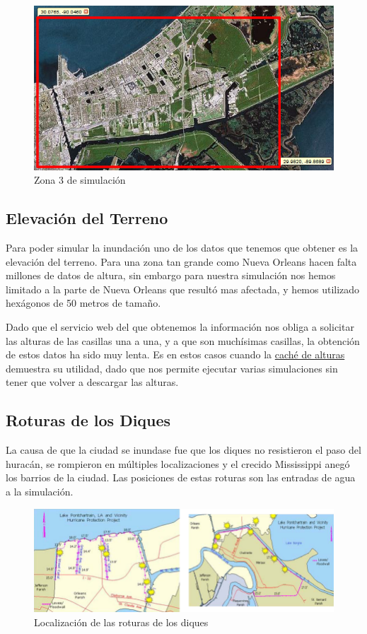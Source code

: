 \begin{figure}[H]
 \centering
 \includegraphics[width=130mm]{figuras/cap6/NOarea4.png}
 \caption{Zona 3 de simulación} \label{zona3}
\end{figure}

\subsection{Elevación del Terreno}

Para poder simular la inundación uno de los datos que tenemos que obtener es
la elevación del terreno. Para una zona tan grande como Nueva Orleans hacen
falta millones de datos de altura, sin embargo para nuestra simulación nos hemos
limitado a la parte de Nueva Orleans que resultó mas afectada, y hemos utilizado
hexágonos de 50 metros de tamaño.

Dado que el servicio web del que obtenemos la información nos obliga a
solicitar las alturas de las casillas una a una, y a que son muchísimas
casillas, la obtención de estos datos ha sido muy lenta. Es en estos casos
cuando la \hyperref[cache]{caché de alturas} demuestra su utilidad, dado que
nos permite ejecutar varias simulaciones sin tener que volver a descargar las
alturas.

\subsection{Roturas de los Diques}

La causa de que la ciudad se inundase fue que los diques no resistieron el paso
del huracán, se rompieron en múltiples localizaciones y el crecido Mississippi
anegó los barrios de la ciudad. Las posiciones\cite{Pennington06} de estas
roturas son las entradas de agua a la simulación.

\begin{figure}[H]
 \centering
 \includegraphics[width=135mm]{figuras/cap6/dikes.png}
 \caption{Localización de las roturas de los diques}
\end{figure}

